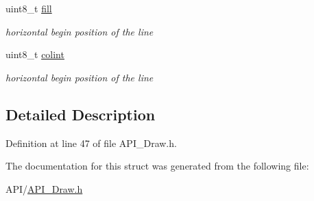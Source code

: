 \begin{DoxyCompactItemize}
uint8\+\_\+t \hyperlink{struct_e_l_l_i_p_s_e_a2ffb43952012965173826ee9554c864a}{fill}
\begin{DoxyCompactList}\small\item\em horizontal begin position of the line \end{DoxyCompactList}\item 
\mbox{\label{struct_e_l_l_i_p_s_e_a21caa4b27a71b7967f1a2d64f196a674}} 
uint8\+\_\+t \hyperlink{struct_e_l_l_i_p_s_e_a21caa4b27a71b7967f1a2d64f196a674}{colint}
\begin{DoxyCompactList}\small\item\em horizontal begin position of the line \end{DoxyCompactList}\end{DoxyCompactItemize}


\subsection{Detailed Description}


Definition at line 47 of file A\+P\+I\+\_\+\+Draw.\+h.



The documentation for this struct was generated from the following file\+:\begin{DoxyCompactItemize}
\item 
A\+P\+I/\hyperlink{_a_p_i___draw_8h}{A\+P\+I\+\_\+\+Draw.\+h}\end{DoxyCompactItemize}
